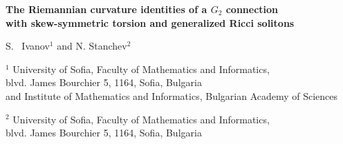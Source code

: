 \documentclass[10pt,british]{article}
\begin{document}
\begin{center}
\vspace*{-1.0cm}


\vspace{1.2 cm} {\Large \bf The Riemannian curvature identities of a $G_2$ connection \\[3mm]  with  skew-symmetric torsion and generalized Ricci solitons
} %

\vspace{1cm}
 {\large S.~ Ivanov${}^1$ and  N. Stanchev$^2$}


\vspace{0.5cm}

${}^1$ University of Sofia, Faculty of Mathematics and
Informatics,\\ blvd. James Bourchier 5, 1164, Sofia, Bulgaria
\\and  Institute of Mathematics and Informatics,
Bulgarian Academy of Sciences

\vspace{0.5cm}
${}^2$ University of Sofia, Faculty of Mathematics and
Informatics,\\ blvd. James Bourchier 5, 1164, Sofia, Bulgaria\\

\vspace{0.5cm}

\end{center}
\end{document}
